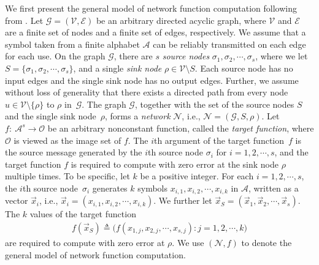 \documentclass[11pt,draftclsnofoot,onecolumn]{IEEEtran}
\newcommand{\mA}{\mathcal{A}}
\newcommand{\mN}{\mathcal{N}}
\newcommand{\mE}{\mathcal{E}}
\newcommand{\mO}{\mathcal{O}}
\newcommand{\mG}{\mathcal{G}}
\newcommand{\mV}{\mathcal{V}}
\begin{document}
We first present the general model of network function computation following from \cite{Guang_Improved_upper_bound}. Let $\mG=(\mV,\mE)$ be an arbitrary directed acyclic graph, where $\mV$ and $\mE$ are a finite set of nodes and a finite set of edges, respectively. We assume that a symbol taken from a finite alphabet $\mA$ can be reliably transmitted on each edge for each use. On the graph $\mathcal{G}$, there are $s$ \emph{source nodes} $\sigma_1, \sigma_2, \cdots, \sigma_s$, where we let $S=\{\sigma_1, \sigma_2, \cdots, \sigma_s\}$, and a single \emph{sink node} $\rho \in \mV \setminus S$. Each source node has no input edges and the single sink node  has no output edges. Further, we assume without loss of generality that there exists a directed path from every node $u\in \mathcal{V}\setminus \{\rho\}$ to $\rho$ in~$\mG$. The graph $\mG$, together with the set of the source nodes $S$ and the single sink node~$\rho$, forms a \emph{network} $\mN$, i.e., $\mN=(\mG, S, \rho)$.
Let $f:~\mA^s \to \mO$ be an arbitrary nonconstant function, called the \emph{target function}, where $\mO$ is viewed as the image set of $f$. The $i$th argument of the target function~$f$ is the source message generated by the $i$th source node $\sigma_i$ for $i=1,2,\cdots,s$, and the target function $f$ is required to  compute with zero error at the sink node $\rho$ multiple times. To be specific, let
$k$ be a positive integer. For each $i=1,2,\cdots,s$, the $i$th source node~$\sigma_i$ generates $k$ symbols $x_{i,1},x_{i,2},\cdots,x_{i,k}$  in $\mA$, written as a vector $\vec{x}_i$, i.e., $\vec{x}_i=(x_{i,1},x_{i,2},\cdots,x_{i,k})$.
We further let $\vec{x}_S=(\vec{x}_{1}, \vec{x}_{2}, \cdots, \vec{x}_{s})$. The $k$ values of the target function
\begin{align}%
f(\vec{x}_S)\triangleq\big(f(x_{1,j},x_{2,j}, \cdots, x_{s,j}): j=1,2,\cdots,k \big)\nonumber
\end{align}
are required to compute with zero error at $\rho$. We use $(\mN,f)$ to denote the general model of network function computation.
\end{document}
